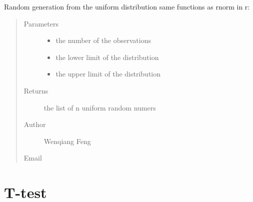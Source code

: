 \documentclass[letterpaper,11pt,english]{sphinxmanual}
\begin{document}
\begin{fulllineitems}
Random generation from the uniform distribution
same functions as rnorm in r: 
\begin{quote}\begin{description}
\item[{Parameters}] \leavevmode\begin{itemize}
\item {} 
 \textendash{} the number of the observations

\item {} 
 \textendash{} the lower limit of the distribution

\item {} 
 \textendash{} the upper limit of the distribution

\end{itemize}

\item[{Returns}] \leavevmode
the list of n uniform random numers

\item[{Author}] \leavevmode
Wenqiang Feng

\item[{Email}] \leavevmode
{}

\end{description}\end{quote}

\end{fulllineitems}



\section{T-test}
\label{\detokenize{api:module-statspy.tests}}\label{\detokenize{api:t-test}}
\end{document}
